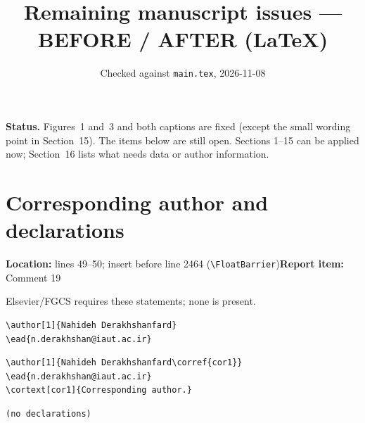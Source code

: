 \documentclass[10pt,a4paper]{article}
\title{Remaining manuscript issues --- BEFORE / AFTER (LaTeX)}
\author{Checked against \texttt{main.tex}, 2026-11-08}
\date{}
\newcommand{\issue}[3]{\section{#1}{\raggedright\noindent\textcolor{note}{\small\textbf{Location:} #2\quad\textbf{Report item:} #3}\par}\smallskip}
\newcommand{\why}[1]{\noindent\textcolor{note}{\small #1}\par\smallskip}
\begin{document}
\maketitle
\tableofcontents
\bigskip

\noindent\textbf{Status.} Figures~1 and~3 and both captions are fixed (except the small wording point in Section~15). The items below are still open. Sections 1--15 can be applied now; Section~16 lists what needs data or author information.

\issue{Corresponding author and declarations}{lines 49--50; insert before line 2464 (\texttt{\textbackslash FloatBarrier})}{Comment 19}
\why{Elsevier/FGCS requires these statements; none is present.}

\begin{before}[lines 49--50]
\begin{Verbatim}
\author[1]{Nahideh Derakhshanfard}
\ead{n.derakhshan@iaut.ac.ir}
\end{Verbatim}
\end{before}

\begin{after}
\begin{Verbatim}
\author[1]{Nahideh Derakhshanfard\corref{cor1}}
\ead{n.derakhshan@iaut.ac.ir}
\cortext[cor1]{Corresponding author.}
\end{Verbatim}
\end{after}

\begin{before}
\begin{Verbatim}
(no declarations)
\end{Verbatim}
\end{before}
\end{document}
